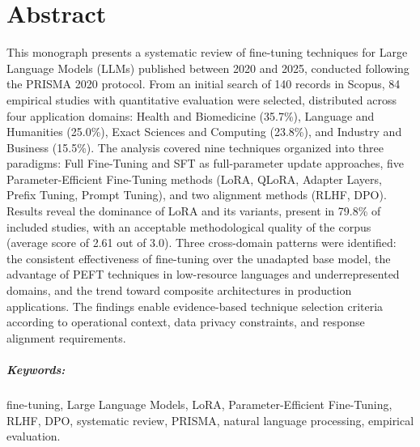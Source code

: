 \chapter{Abstract}
This monograph presents a systematic review of fine-tuning techniques for Large Language Models (LLMs) published between 2020 and 2025, conducted following the PRISMA 2020 protocol. From an initial search of 140 records in Scopus, 84 empirical studies with quantitative evaluation were selected, distributed across four application domains: Health and Biomedicine (35.7\%), Language and Humanities (25.0\%), Exact Sciences and Computing (23.8\%), and Industry and Business (15.5\%). The analysis covered nine techniques organized into three paradigms: Full Fine-Tuning and SFT as full-parameter update approaches, five Parameter-Efficient Fine-Tuning methods (LoRA, QLoRA, Adapter Layers, Prefix Tuning, Prompt Tuning), and two alignment methods (RLHF, DPO). Results reveal the dominance of LoRA and its variants, present in 79.8\% of included studies, with an acceptable methodological quality of the corpus (average score of 2.61 out of 3.0). Three cross-domain patterns were identified: the consistent effectiveness of fine-tuning over the unadapted base model, the advantage of PEFT techniques in low-resource languages and underrepresented domains, and the trend toward composite architectures in production applications. The findings enable evidence-based technique selection criteria according to operational context, data privacy constraints, and response alignment requirements.

\paragraph{Keywords:} fine-tuning, Large Language Models, LoRA, Parameter-Efficient Fine-Tuning, RLHF, DPO, systematic review, PRISMA, natural language processing, empirical evaluation.